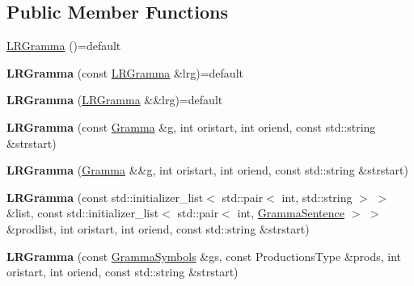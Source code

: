 \subsection*{Public Member Functions}
\begin{DoxyCompactItemize}
\item 
\hyperlink{classx2_1_1_l_r_gramma_aaf38ee87d4dd3be25b48356f204ab17f}{L\+R\+Gramma} ()=default
\item 
\mbox{\label{classx2_1_1_l_r_gramma_ad8567e4bafe68acd70fb93b98da3afc9}} 
{\bfseries L\+R\+Gramma} (const \hyperlink{classx2_1_1_l_r_gramma}{L\+R\+Gramma} \&lrg)=default
\item 
\mbox{\label{classx2_1_1_l_r_gramma_a15273d95cdfeca70fbbaf22afd78213a}} 
{\bfseries L\+R\+Gramma} (\hyperlink{classx2_1_1_l_r_gramma}{L\+R\+Gramma} \&\&lrg)=default
\item 
\mbox{\label{classx2_1_1_l_r_gramma_a06de326709a3656338a6dc0f18ba8c1f}} 
{\bfseries L\+R\+Gramma} (const \hyperlink{classx2_1_1_gramma}{Gramma} \&g, int oristart, int oriend, const std\+::string \&strstart)
\item 
\mbox{\label{classx2_1_1_l_r_gramma_af5c52d1d6ced5980fbe4859bdcad130c}} 
{\bfseries L\+R\+Gramma} (\hyperlink{classx2_1_1_gramma}{Gramma} \&\&g, int oristart, int oriend, const std\+::string \&strstart)
\item 
\mbox{\label{classx2_1_1_l_r_gramma_a89bb2afe42f616a2ee9ba2efa41c103b}} 
{\bfseries L\+R\+Gramma} (const std\+::initializer\+\_\+list$<$ std\+::pair$<$ int, std\+::string $>$ $>$ \&list, const std\+::initializer\+\_\+list$<$ std\+::pair$<$ int, \hyperlink{classx2_1_1_gramma_sentence}{Gramma\+Sentence} $>$ $>$ \&prodlist, int oristart, int oriend, const std\+::string \&strstart)
\item 
\mbox{\label{classx2_1_1_l_r_gramma_a2732ee4cc51030f039cf5f90b5475a51}} 
{\bfseries L\+R\+Gramma} (const \hyperlink{classx2_1_1_gramma_symbols}{Gramma\+Symbols} \&gs, const Productions\+Type \&prods, int oristart, int oriend, const std\+::string \&strstart)
\item 
\mbox{\label{classx2_1_1_l_r_gramma_ae9b5a9130670906995f24b328f04e825}} 

\end{DoxyCompactItemize}

